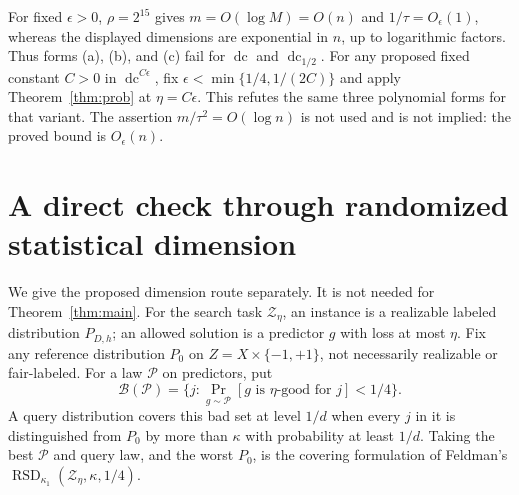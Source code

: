 \documentclass[11pt]{article}
\DeclareMathOperator{\dc}{dc}
\DeclareMathOperator{\RSD}{RSD}
\newcommand{\1}{\mathbf 1}
\begin{document}
For fixed $\epsilon>0$, $\rho=2^{15}$ gives $m=O(\log M)=O(n)$ and $1/\tau=O_\epsilon(1)$, whereas the displayed dimensions are exponential in $n$, up to logarithmic factors. Thus forms (a), (b), and (c) fail for $\dc$ and $\dc_{1/2}$. For any proposed fixed constant $C>0$ in $\dc^{C\epsilon}$, fix $\epsilon<\min\{1/4,1/(2C)\}$ and apply Theorem~\ref{thm:prob} at $\eta=C\epsilon$. This refutes the same three polynomial forms for that variant. The assertion $m/\tau^2=O(\log n)$ is not used and is not implied: the proved bound is $O_\epsilon(n)$.

\section{A direct check through randomized statistical dimension}\label{sec:rsd}
We give the proposed dimension route separately. It is not needed for Theorem~\ref{thm:main}.
For the search task $\mathcal Z_\eta$, an instance is a realizable labeled distribution $P_{D,h}$; an allowed solution is a predictor $g$ with loss at most $\eta$. Fix any reference distribution $P_0$ on $Z=X\times\{-1,+1\}$, not necessarily realizable or fair-labeled. For a law $\mathcal P$ on predictors, put
\[
 \mathcal B(\mathcal P)=\{j:\Pr_{g\sim\mathcal P}[g\text{ is }\eta\text{-good for }j]<1/4\}.
\]
A query distribution covers this bad set at level $1/d$ when every $j$ in it is distinguished from $P_0$ by more than $\kappa$ with probability at least $1/d$. Taking the best $\mathcal P$ and query law, and the worst $P_0$, is the covering formulation of Feldman's $\RSD_{\kappa_1}(\mathcal Z_\eta,\kappa,1/4)$.
\end{document}
